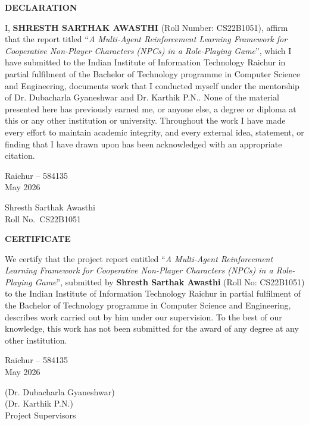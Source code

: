 \documentclass[12pt, a4paper, oneside]{report}
\newcommand{\thesisTitle}{A Multi-Agent Reinforcement Learning Framework for Cooperative Non-Player Characters (NPCs) in a Role-Playing Game}
\newcommand{\studentName}{Shresth Sarthak Awasthi}
\newcommand{\rollNumber}{CS22B1051}
\newcommand{\supervisorName}{Dr. Dubacharla Gyaneshwar}
\newcommand{\supervisorNameB}{Dr. Karthik P.N.}
\newcommand{\departmentName}{Computer Science and Engineering}
\newcommand{\submissionMonthYear}{May 2026}
\newcommand{\submissionLocation}{Raichur -- 584135}
\newcommand{\degreeName}{Bachelor of Technology}
\newcommand{\frontmatterheading}[1]{%
  \begin{center}\Large\bfseries #1\end{center}
  \vspace{0.5cm}
}
\begin{document}
\setcounter{page}{2}

\clearpage
\thispagestyle{plain}
\frontmatterheading{DECLARATION}

\noindent I, \textbf{\MakeUppercase{\studentName}} (Roll Number: \rollNumber),
affirm that the report titled ``\textit{\thesisTitle}'', which I have submitted
to the Indian Institute of Information Technology Raichur in partial fulfilment
of the \degreeName{} programme in \departmentName{}, documents work that I
conducted myself under the mentorship of \supervisorName{} and
\supervisorNameB{}. None of the material presented here has previously earned
me, or anyone else, a degree or diploma at this or any other institution or
university. Throughout the work I have made every effort to maintain academic
integrity, and every external idea, statement, or finding that I have drawn
upon has been acknowledged with an appropriate citation.

\vspace{2.5cm}
\noindent
\begin{minipage}[t]{0.5\textwidth}
\submissionLocation \\
\submissionMonthYear
\end{minipage}
\hfill
\begin{minipage}[t]{0.4\textwidth}
\raggedleft
\studentName \\
Roll No.~\rollNumber
\end{minipage}

\clearpage
\thispagestyle{plain}
\frontmatterheading{CERTIFICATE}

\noindent We certify that the project report entitled
``\textit{\thesisTitle}'', submitted by \textbf{\studentName} (Roll
No: \rollNumber) to the
Indian Institute of Information Technology Raichur in partial fulfilment
of the \degreeName{} programme in \departmentName{}, describes work carried out
by him under our supervision. To the best of our knowledge, this work has not
been submitted for the award of any degree at any other institution.

\vspace{3cm}
\noindent
\begin{minipage}[t]{0.5\textwidth}
\submissionLocation \\
\submissionMonthYear
\end{minipage}
\hfill
\begin{minipage}[t]{0.4\textwidth}
\raggedleft
(\supervisorName) \\[1em]
(\supervisorNameB) \\
Project Supervisors
\end{minipage}
\end{document}

